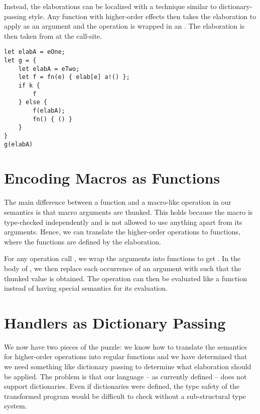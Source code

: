 Instead, the elaborations can be localized with a technique similar to dictionary-passing style. Any function with higher-order effects then takes the elaboration to apply as an argument and the operation is wrapped in an . The elaboration is then taken from  at the call-site.
\begin{lstlisting}[language=elaine,style=fancy]
let elabA = eOne;
let g = {
    let elabA = eTwo;
    let f = fn(e) { elab[e] a!() };
    if k {
        f
    } else {
        f(elabA);
        fn() { () }
    }
}
g(elabA)
\end{lstlisting}

\section{Encoding Macros as Functions}

The main difference between a function and a macro-like operation in our semantics is that macro arguments are thunked. This holds because the macro is type-checked independently and is not allowed to use anything apart from its arguments. Hence, we can translate the higher-order operations to functions, where the functions are defined by the elaboration.

For any operation call , we wrap the arguments into functions to get . In the body of , we then replace each occurrence of an argument  with  such that the thunked value is obtained. The  operation can then be evaluated like a function instead of having special semantics for its evaluation.

\section{Handlers as Dictionary Passing}

We now have two pieces of the puzzle: we know how to translate the semantics for higher-order operations into regular functions and we have determined that we need something like dictionary passing to determine what elaboration should be applied. The problem is that our language -- as currently defined -- does not support dictionaries. Even if dictionaries were defined, the type safety of the transformed program would be difficult to check without a sub-structural type system.

